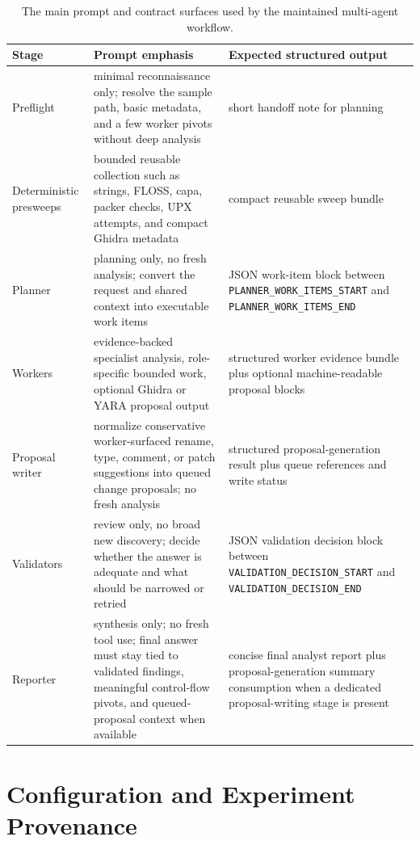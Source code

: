 \begin{table}[h]
\centering
\small
\begin{tabular}{p{} p{} p{}}
\textbf{Stage} & \textbf{Prompt emphasis} & \textbf{Expected structured output} \\
\hline
Preflight & minimal reconnaissance only; resolve the sample path, basic metadata, and a few worker pivots without deep analysis & short handoff note for planning \\
Deterministic presweeps & bounded reusable collection such as strings, FLOSS, capa, packer checks, UPX attempts, and compact Ghidra metadata & compact reusable sweep bundle \\
Planner & planning only, no fresh analysis; convert the request and shared context into executable work items & JSON work-item block between \texttt{PLANNER\_WORK\_ITEMS\_START} and \texttt{PLANNER\_WORK\_ITEMS\_END} \\
Workers & evidence-backed specialist analysis, role-specific bounded work, optional Ghidra or YARA proposal output & structured worker evidence bundle plus optional machine-readable proposal blocks \\
Proposal writer & normalize conservative worker-surfaced rename, type, comment, or patch suggestions into queued change proposals; no fresh analysis & structured proposal-generation result plus queue references and write status \\
Validators & review only, no broad new discovery; decide whether the answer is adequate and what should be narrowed or retried & JSON validation decision block between \texttt{VALIDATION\_DECISION\_START} and \texttt{VALIDATION\_DECISION\_END} \\
Reporter & synthesis only; no fresh tool use; final answer must stay tied to validated findings, meaningful control-flow pivots, and queued-proposal context when available & concise final analyst report plus proposal-generation summary consumption when a dedicated proposal-writing stage is present \\
\end{tabular}
\caption{The main prompt and contract surfaces used by the maintained multi-agent workflow.}
\label{tab:prompt-surfaces}
\end{table}

\section{Configuration and Experiment Provenance}

